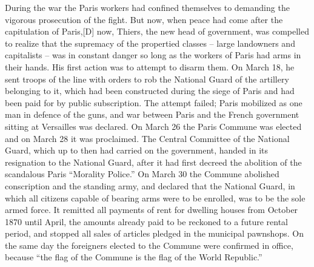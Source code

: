 \documentclass{article}
\begin{document}
During the war the Paris workers had confined themselves to demanding the
vigorous prosecution of the fight. But now, when peace had come after the
capitulation of Paris,[D] now, Thiers, the new head of government, was
compelled to realize that the supremacy of the propertied classes – large
landowners and capitalists – was in constant danger so long as the workers
of Paris had arms in their hands. His first action was to attempt to
disarm them. On March 18, he sent troops of the line with orders to rob
the National Guard of the artillery belonging to it, which had been
constructed during the siege of Paris and had been paid for by public
subscription. The attempt failed; Paris mobilized as one man in defence of
the guns, and war between Paris and the French government sitting at
Versailles was declared. On March 26 the Paris Commune was elected and on
March 28 it was proclaimed. The Central Committee of the National Guard,
which up to then had carried on the government, handed in its resignation
to the National Guard, after it had first decreed the abolition of the
scandalous Paris “Morality Police.” On March 30 the Commune abolished
conscription and the standing army, and declared that the National Guard,
in which all citizens capable of bearing arms were to be enrolled, was to
be the sole armed force. It remitted all payments of rent for dwelling
houses from October 1870 until April, the amounts already paid to be
reckoned to a future rental period, and stopped all sales of articles
pledged in the municipal pawnshops. On the same day the foreigners elected
to the Commune were confirmed in office, because “the flag of the Commune
is the flag of the World Republic.”
\end{document}
